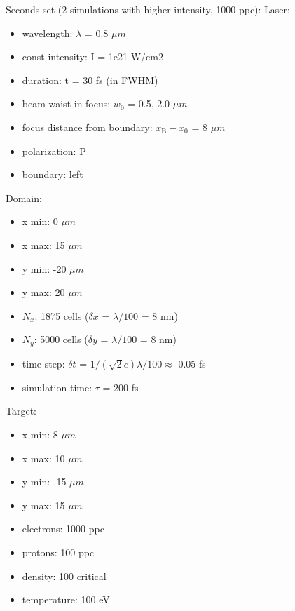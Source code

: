 \noindent
Seconds set (2 simulations with higher intensity, 1000 ppc):
\noindent
Laser:
\begin{itemize}
	\item wavelength: $ \lambda $ = 0.8 $ \mu m $
	\item const intensity: I = 1e21 W/cm2
	\item duration: t = 30 fs (in FWHM)
	\item beam waist in focus: $ w_0 $ = 0.5, 2.0 $ \mu m $
	\item focus distance from boundary: $ x_\mathrm{B} - x_0 $ = 8 $ \mu m $
	\item polarization: P
	\item boundary: left 
\end{itemize}
Domain:
\begin{itemize}
	\item x min: 0 $ \mu m $
	\item x max: 15 $ \mu m $
	\item y min: -20 $ \mu m $
	\item y max: 20 $ \mu m $
	\item $ N_x $: 1875 cells ($ \delta x $ = $ \lambda/100 $ = 8 nm)
	\item $ N_y $: 5000 cells ($ \delta y $ = $ \lambda/100 $ = 8 nm)
	\item time step: $ \delta t $ = $ 1/(\sqrt{2} c) \lambda /100 \approx $ 0.05 fs 
	\item simulation time: $ \tau $ = 200 fs
\end{itemize}
Target:
\begin{itemize}
	\item x min: 8 $ \mu m $
	\item x max: 10 $ \mu m $
	\item y min: -15 $ \mu m $
	\item y max: 15 $ \mu m $
	\item electrons: 1000 ppc
	\item protons: 100 ppc
	\item density: 100 critical
	\item temperature: 100 eV
\end{itemize}

